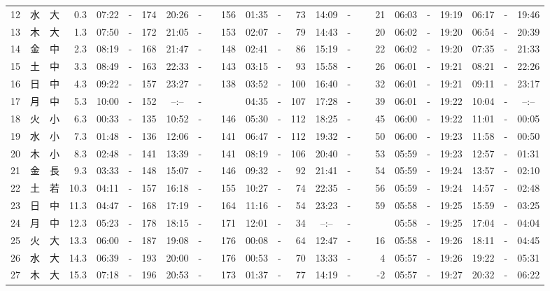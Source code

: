 \documentclass[12pt,a4j]{jsarticle}
\begin{document}
\begin{table}[htbp]
\begin{center}
{\begin{tabular}{|rc|cr|ccrccr|ccrccr|ccc|ccc|}
12 & 水 & 大 &  0.3 &  07:22 &-& 174 &  20:26 &-& 156 &  01:35 &-&  73 &  14:09 &-&  21 & 06:03 & -& 19:19 & 06:17 & -& 19:46 \\
13 & 木 & 大 &  1.3 &  07:50 &-& 172 &  21:05 &-& 153 &  02:07 &-&  79 &  14:43 &-&  20 & 06:02 & -& 19:20 & 06:54 & -& 20:39 \\
14 & 金 & 中 &  2.3 &  08:19 &-& 168 &  21:47 &-& 148 &  02:41 &-&  86 &  15:19 &-&  22 & 06:02 & -& 19:20 & 07:35 & -& 21:33 \\
15 & 土 & 中 &  3.3 &  08:49 &-& 163 &  22:33 &-& 143 &  03:15 &-&  93 &  15:58 &-&  26 & 06:01 & -& 19:21 & 08:21 & -& 22:26 \\
16 & 日 & 中 &  4.3 &  09:22 &-& 157 &  23:27 &-& 138 &  03:52 &-& 100 &  16:40 &-&  32 & 06:01 & -& 19:21 & 09:11 & -& 23:17 \\
17 & 月 & 中 &  5.3 &  10:00 &-& 152 &  --:-- &-&~~~~~ &  04:35 &-& 107 &  17:28 &-&  39 & 06:01 & -& 19:22 & 10:04 & -& --:-- \\
18 & 火 & 小 &  6.3 &  00:33 &-& 135 &  10:52 &-& 146 &  05:30 &-& 112 &  18:25 &-&  45 & 06:00 & -& 19:22 & 11:01 & -& 00:05 \\
19 & 水 & 小 &  7.3 &  01:48 &-& 136 &  12:06 &-& 141 &  06:47 &-& 112 &  19:32 &-&  50 & 06:00 & -& 19:23 & 11:58 & -& 00:50 \\
20 & 木 & 小 &  8.3 &  02:48 &-& 141 &  13:39 &-& 141 &  08:19 &-& 106 &  20:40 &-&  53 & 05:59 & -& 19:23 & 12:57 & -& 01:31 \\
21 & 金 & 長 &  9.3 &  03:33 &-& 148 &  15:07 &-& 146 &  09:32 &-&  92 &  21:41 &-&  54 & 05:59 & -& 19:24 & 13:57 & -& 02:10 \\
22 & 土 & 若 & 10.3 &  04:11 &-& 157 &  16:18 &-& 155 &  10:27 &-&  74 &  22:35 &-&  56 & 05:59 & -& 19:24 & 14:57 & -& 02:48 \\
23 & 日 & 中 & 11.3 &  04:47 &-& 168 &  17:19 &-& 164 &  11:16 &-&  54 &  23:23 &-&  59 & 05:58 & -& 19:25 & 15:59 & -& 03:25 \\
24 & 月 & 中 & 12.3 &  05:23 &-& 178 &  18:15 &-& 171 &  12:01 &-&  34 &  --:-- &-&~~~~~ & 05:58 & -& 19:25 & 17:04 & -& 04:04 \\
25 & 火 & 大 & 13.3 &  06:00 &-& 187 &  19:08 &-& 176 &  00:08 &-&  64 &  12:47 &-&  16 & 05:58 & -& 19:26 & 18:11 & -& 04:45 \\
26 & 水 & 大 & 14.3 &  06:39 &-& 193 &  20:00 &-& 176 &  00:53 &-&  70 &  13:33 &-&   4 & 05:57 & -& 19:26 & 19:22 & -& 05:31 \\
27 & 木 & 大 & 15.3 &  07:18 &-& 196 &  20:53 &-& 173 &  01:37 &-&  77 &  14:19 &-&  -2 & 05:57 & -& 19:27 & 20:32 & -& 06:22 \\

\end{tabular}}
\end{center}
\end{table}
\end{document}
